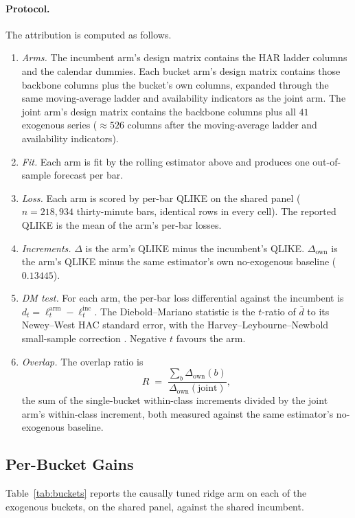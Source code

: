 \paragraph{Protocol.} The attribution is computed as follows.
\begin{enumerate}
\item \emph{Arms.} The incumbent arm's design matrix contains the HAR ladder
columns and the calendar dummies. Each bucket arm's design matrix contains
those backbone columns plus the bucket's own columns, expanded through the
same moving-average ladder and availability indicators as the joint arm. The
joint arm's design matrix contains the backbone columns plus all $41$
exogenous series ($\approx 526$ columns after the moving-average ladder and
availability indicators).
\item \emph{Fit.} Each arm is fit by the rolling estimator above and produces
one out-of-sample forecast per bar.
\item \emph{Loss.} Each arm is scored by per-bar QLIKE on the shared panel
($n = 218{,}934$ thirty-minute bars, identical rows in every cell). The
reported QLIKE is the mean of the arm's per-bar losses.
\item \emph{Increments.} $\Delta$ is the arm's QLIKE minus the incumbent's
QLIKE. $\Delta_{\text{own}}$ is the arm's QLIKE minus the same estimator's
own no-exogenous baseline ($0.13445$).
\item \emph{DM test.} For each arm, the per-bar loss differential against the
incumbent is $d_t = \ell^{\text{arm}}_t - \ell^{\text{inc}}_t$. The
Diebold--Mariano statistic \citep{DieboldMariano1995} is the $t$-ratio of
$\bar{d}$ to its Newey--West HAC standard error, with the
Harvey--Leybourne--Newbold small-sample correction
\citep{HarveyLeybourneNewbold1997}. Negative $t$ favours the arm.
\item \emph{Overlap.} The overlap ratio is
\[
R \;=\; \frac{\sum_{b} \Delta_{\text{own}}(b)}{\Delta_{\text{own}}(\text{joint})},
\]
the sum of the single-bucket within-class increments divided by the joint
arm's within-class increment, both measured against the same estimator's
no-exogenous baseline.
\end{enumerate}

\subsection{Per-Bucket Gains}

Table~\ref{tab:buckets} reports the causally tuned ridge arm on each of the
exogenous buckets, on the shared panel, against the shared incumbent.

